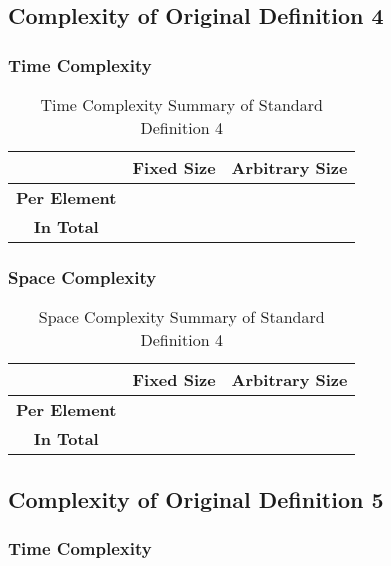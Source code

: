\documentclass[conference]{IEEEtran}
\begin{document}
\subsection{Complexity of Original Definition 4}
\label{ca:p2_d04}

\subsubsection{Time Complexity}

\begin{table}[H]
    \centering
    \caption{Time Complexity Summary of Standard Definition 4}
    \begin{tabular}{|c|c|c|}
        \hline
        & \textbf{Fixed Size} & \textbf{Arbitrary Size} \\
        \hline
        \textbf{Per Element} &  &  \\
        \hline
        \textbf{In Total} &  &  \\
        \hline
    \end{tabular}
    \label{tab:time_p2_d04}
\end{table}

\subsubsection{Space Complexity}

\begin{table}[H]
    \centering
    \caption{Space Complexity Summary of Standard Definition 4}
    \begin{tabular}{|c|c|c|}
        \hline
        & \textbf{Fixed Size} & \textbf{Arbitrary Size} \\
        \hline
        \textbf{Per Element} &  &  \\
        \hline
        \textbf{In Total} &  &  \\
        \hline
    \end{tabular}
    \label{tab:space_p2_d04}
\end{table}

\subsection{Complexity of Original Definition 5}
\label{ca:p2_d05}

\subsubsection{Time Complexity}
\end{document}
